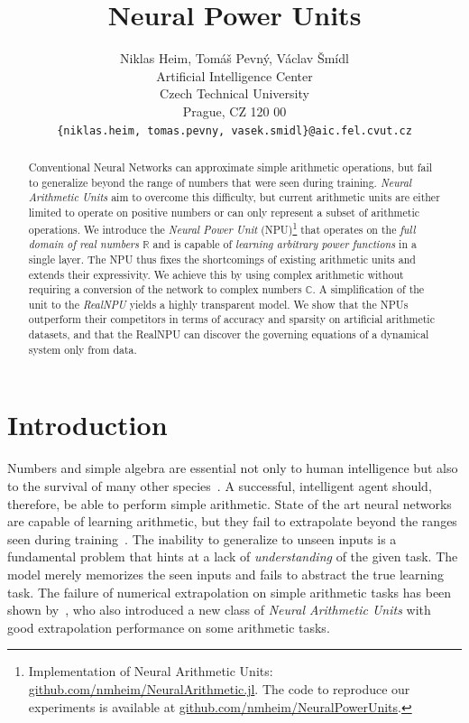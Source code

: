 \documentclass[9pt]{article}
\title{Neural Power Units}
\author{
  Niklas Heim,
  Tom\'a\v s Pevn\'y,
  V\'aclav \v Sm\'idl\\
  Artificial Intelligence Center\\
  Czech Technical University\\
  Prague, CZ 120 00\\
  \texttt{\{niklas.heim, tomas.pevny, vasek.smidl\}@aic.fel.cvut.cz}\\
}
\begin{document}
\maketitle

\begin{abstract}
  Conventional Neural Networks can approximate simple arithmetic operations,
  but fail to generalize beyond the range of numbers that were seen during
  training.  \emph{Neural Arithmetic Units} aim to overcome this difficulty,
  but current arithmetic units are either limited to operate on positive
  numbers or can only represent a subset of arithmetic operations. We introduce
  the \emph{Neural Power Unit} (NPU)\footnote{
    Implementation of Neural Arithmetic Units: \url{github.com/nmheim/NeuralArithmetic.jl}.
    The code to reproduce our experiments is available at \url{github.com/nmheim/NeuralPowerUnits}.
  }
  that operates on the \emph{full domain of
  real numbers} $\mathbb{R}$ and is capable of \emph{learning arbitrary power functions} in
  a single layer.  The NPU thus fixes the shortcomings of existing arithmetic
  units and extends their expressivity. We achieve this by using
  complex arithmetic without requiring a conversion of the network to complex
  numbers $\mathbb{C}$.
  A simplification of the unit to the \emph{RealNPU} yields a highly transparent model.
  We show that the NPUs outperform their competitors in terms of
  accuracy and sparsity on artificial arithmetic datasets, and that the RealNPU can discover
  the governing equations of a dynamical system only from data.
\end{abstract}


\section{Introduction}%
\label{sec:introduction}

Numbers and simple algebra are essential not only to human intelligence but
also to the survival of many other
species~\citep{dehaene_number_2011,gallistel_finding_2018}. A successful,
intelligent agent should, therefore, be able to perform simple arithmetic.  State
of the art neural networks are capable of learning arithmetic, but they
fail to extrapolate beyond the ranges seen during
training~\citep{suzgun_evaluating_2018,lake_generalization_2018}.  The
inability to generalize to unseen inputs is a fundamental problem that hints at
a lack of \emph{understanding} of the given task. The model merely memorizes
the seen inputs and fails to abstract the true learning task.  The failure of
numerical extrapolation on simple arithmetic tasks has been shown
by~\cite{trask_neural_2018}, who also introduced a new class of \emph{Neural
Arithmetic Units} with good extrapolation performance on some arithmetic
tasks.
\end{document}
